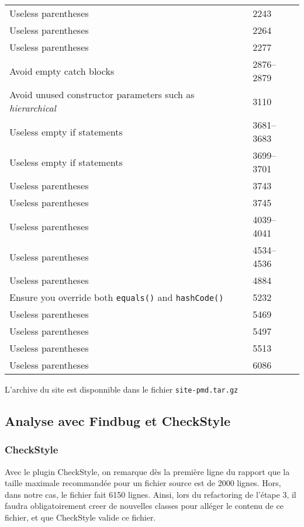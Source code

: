 		\begin{tabular}{ll}
            Useless parentheses &  2243\\
            Useless parentheses &  2264\\
            Useless parentheses &  2277\\
            Avoid empty catch blocks &  2876--2879\\
            Avoid unused constructor parameters such as \emph{hierarchical} & 3110\\
            Useless empty if statements &  3681--3683\\
            Useless empty if statements &  3699--3701\\
            Useless parentheses &  3743\\
            Useless parentheses &  3745\\
            Useless parentheses &  4039--4041\\
            Useless parentheses &  4534--4536\\
            Useless parentheses &  4884\\
            Ensure you override both \texttt{equals()} and \texttt{hashCode()} & 5232\\
            Useless parentheses &  5469\\
            Useless parentheses &  5497\\
            Useless parentheses &  5513\\
            Useless parentheses &  6086\\
        \end{tabular}

		L'archive du site est disponnible dans le fichier \og \verb#site-pmd.tar.gz# \fg

	\subsection{Analyse avec Findbug et CheckStyle}
		\subsubsection{CheckStyle}
			Avec le plugin CheckStyle, on remarque dès la première ligne du rapport que la taille maximale recommandée pour un fichier source est de 2000 lignes. Hors, dans notre cas, le fichier fait 6150 lignes. Ainsi, lors du refactoring de l'étape 3, il faudra obligatoirement creer de nouvelles classes pour alléger le contenu de ce fichier, et que CheckStyle valide ce fichier.

